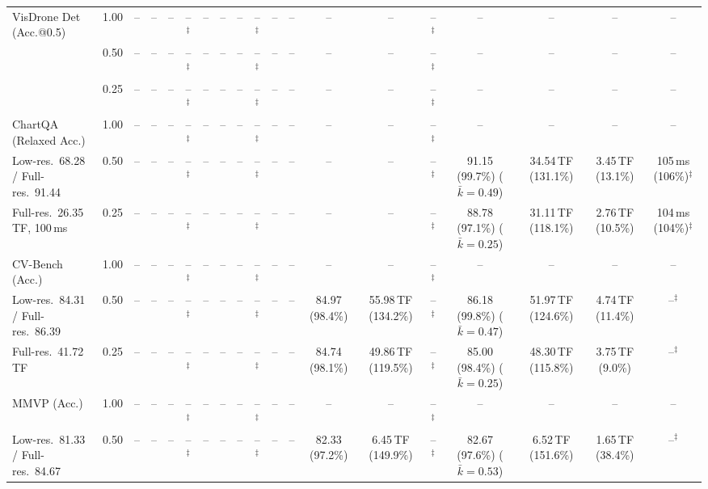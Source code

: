 \begin{table}[t]
{\begin{tabular}{l c | c c c c | c c c c | c c | c c c | c c c c}
\cmidrule(lr){1-19}
VisDrone Det (Acc.@0.5) & 1.00 & -- & -- & -- & --$^\ddagger$ & -- & -- & -- & --$^\ddagger$ & -- & -- & -- & -- & --$^\ddagger$ & -- & -- & -- & -- \\
 & 0.50 & -- & -- & -- & --$^\ddagger$ & -- & -- & -- & --$^\ddagger$ & -- & -- & -- & -- & --$^\ddagger$ & -- & -- & -- & -- \\
 & 0.25 & -- & -- & -- & --$^\ddagger$ & -- & -- & -- & --$^\ddagger$ & -- & -- & -- & -- & --$^\ddagger$ & -- & -- & -- & -- \\
\cmidrule(lr){1-19}
ChartQA (Relaxed Acc.) & 1.00 & -- & -- & -- & --$^\ddagger$ & -- & -- & -- & --$^\ddagger$ & -- & -- & -- & -- & --$^\ddagger$ & -- & -- & -- & -- \\
{\footnotesize Low-res.\ 68.28 / Full-res.\ 91.44} & 0.50 & -- & -- & -- & --$^\ddagger$ & -- & -- & -- & --$^\ddagger$ & -- & -- & -- & -- & --$^\ddagger$ & \cellcolor{gray!15}91.15 (99.7\%) {\footnotesize ($\bar k{=}0.49$)} & 34.54\,TF (131.1\%) & 3.45\,TF (13.1\%) & 105\,ms (106\%)$^\ddagger$ \\
{\footnotesize Full-res.\ 26.35\,TF, 100\,ms} & 0.25 & -- & -- & -- & --$^\ddagger$ & -- & -- & -- & --$^\ddagger$ & -- & -- & -- & -- & --$^\ddagger$ & 88.78 (97.1\%) {\footnotesize ($\bar k{=}0.25$)} & 31.11\,TF (118.1\%) & 2.76\,TF (10.5\%) & 104\,ms (104\%)$^\ddagger$ \\
\cmidrule(lr){1-19}
CV-Bench (Acc.) & 1.00 & -- & -- & -- & --$^\ddagger$ & -- & -- & -- & --$^\ddagger$ & -- & -- & -- & -- & --$^\ddagger$ & -- & -- & -- & -- \\
{\footnotesize Low-res.\ 84.31 / Full-res.\ 86.39} & 0.50 & -- & -- & -- & --$^\ddagger$ & -- & -- & -- & --$^\ddagger$ & -- & -- & \cellcolor{gray!15}84.97 (98.4\%) & 55.98\,TF (134.2\%) & --$^\ddagger$ & \cellcolor{gray!15}86.18 (99.8\%) {\footnotesize ($\bar k{=}0.47$)} & 51.97\,TF (124.6\%) & 4.74\,TF (11.4\%) & --$^\ddagger$ \\
{\footnotesize Full-res.\ 41.72\,TF} & 0.25 & -- & -- & -- & --$^\ddagger$ & -- & -- & -- & --$^\ddagger$ & -- & -- & \cellcolor{gray!15}84.74 (98.1\%) & 49.86\,TF (119.5\%) & --$^\ddagger$ & \cellcolor{gray!15}85.00 (98.4\%) {\footnotesize ($\bar k{=}0.25$)} & 48.30\,TF (115.8\%) & 3.75\,TF (9.0\%) & --$^\ddagger$ \\
\cmidrule(lr){1-19}
MMVP (Acc.) & 1.00 & -- & -- & -- & --$^\ddagger$ & -- & -- & -- & --$^\ddagger$ & -- & -- & -- & -- & --$^\ddagger$ & -- & -- & -- & -- \\
{\footnotesize Low-res.\ 81.33 / Full-res.\ 84.67} & 0.50 & -- & -- & -- & --$^\ddagger$ & -- & -- & -- & --$^\ddagger$ & -- & -- & 82.33 (97.2\%) & 6.45\,TF (149.9\%) & --$^\ddagger$ & 82.67 (97.6\%) {\footnotesize ($\bar k{=}0.53$)} & 6.52\,TF (151.6\%) & 1.65\,TF (38.4\%) & --$^\ddagger$ \\

\end{tabular}}
\end{table}
